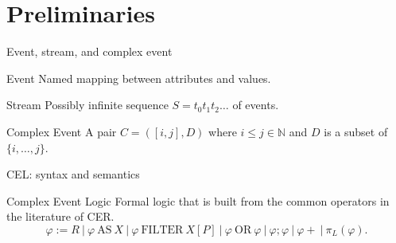 \documentclass[xcolor=pdftex,dvipsnames,table]{beamer}
\begin{document}

\section{Preliminaries}

\begin{frame}{Event, stream, and complex event}
  \begin{block}{Event}
    Named mapping between attributes and values.
  \end{block}
  \begin{block}{Stream}
    Possibly infinite sequence $S = t_{0}t_{1}t_{2}\ldots$ of events.
  \end{block}
  \begin{block}{Complex Event}
    A pair $C = ([i,j], D)$ where $i \le j \in \mathbb{N}$ and $D$ is a subset of $\{i, \ldots, j\}$.
  \end{block}
\end{frame}


\begin{frame}{CEL: syntax and semantics}
  \begin{block}{Complex Event Logic}
    Formal logic that is built from the common operators in the literature of CER.
    \begin{equation*}
      \varphi := R    \ | \ \varphi \ \text{AS} \ X    \ | \    \varphi \ \text{FILTER} \ X[P]  \ | \   \varphi \ \text{OR} \ \varphi   \ | \  \varphi ; \varphi    \ | \  \varphi+ \ | \ \pi_{L}(\varphi).
    \end{equation*}
  \end{block}
\end{frame}

\end{document}
